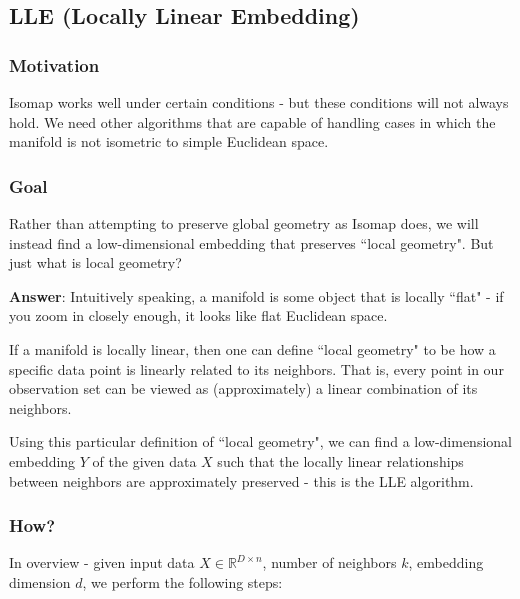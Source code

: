 \subsection{LLE (Locally Linear Embedding)}
\subsubsection*{Motivation}
Isomap works well under certain conditions - but these conditions will not always hold. We need other algorithms that are capable of handling cases in which the manifold is not isometric to simple Euclidean space.

\subsubsection*{Goal}
Rather than attempting to preserve global geometry as Isomap does, we will instead find a low-dimensional embedding that preserves ``local geometry". But just what is local geometry?

\noindent \textbf{Answer}: Intuitively speaking, a manifold is some object that is locally ``flat" - if you zoom in closely enough, it looks like flat Euclidean space.

If a manifold is locally linear, then one can define ``local geometry" to be how a specific data point is linearly related to its neighbors. That is, every point in our observation set can be viewed as (approximately) a linear combination of its neighbors.

Using this particular definition of ``local geometry", we can find a low-dimensional embedding $Y$ of the given data $X$ such that the locally linear relationships between neighbors are approximately preserved - this is the LLE algorithm.

\subsubsection*{How?}
In overview - given input data $X\in \mathbb{R}^{D\times n}$, number of neighbors
$k$, embedding dimension $d$, we perform the following steps:

